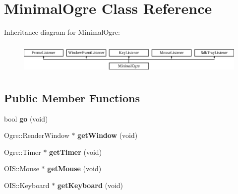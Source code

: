 \hypertarget{classMinimalOgre}{\section{Minimal\-Ogre Class Reference}
\label{classMinimalOgre}
}
Inheritance diagram for Minimal\-Ogre\-:\begin{figure}[H]
\begin{center}
\leavevmode
\includegraphics[height=1.588652cm]{classMinimalOgre}
\end{center}
\end{figure}
\subsection*{Public Member Functions}
\begin{DoxyCompactItemize}
\item 
\hypertarget{classMinimalOgre_a5b533da8a1744ab2ed1e58cb5c6f5d86}{bool {\bfseries go} (void)}\label{classMinimalOgre_a5b533da8a1744ab2ed1e58cb5c6f5d86}

\item 
\hypertarget{classMinimalOgre_aec9556ec93e5235a70c91f98023cb002}{Ogre\-::\-Render\-Window $\ast$ {\bfseries get\-Window} (void)}\label{classMinimalOgre_aec9556ec93e5235a70c91f98023cb002}

\item 
\hypertarget{classMinimalOgre_a8b6708bbf7c46caa6831b6f8da100baa}{Ogre\-::\-Timer $\ast$ {\bfseries get\-Timer} (void)}\label{classMinimalOgre_a8b6708bbf7c46caa6831b6f8da100baa}

\item 
\hypertarget{classMinimalOgre_a1efa7d60e19fb3a175f5180839cf9904}{O\-I\-S\-::\-Mouse $\ast$ {\bfseries get\-Mouse} (void)}\label{classMinimalOgre_a1efa7d60e19fb3a175f5180839cf9904}

\item 
\hypertarget{classMinimalOgre_aa680eefe324989faec4e8a511de631c6}{O\-I\-S\-::\-Keyboard $\ast$ {\bfseries get\-Keyboard} (void)}\label{classMinimalOgre_aa680eefe324989faec4e8a511de631c6}

\end{DoxyCompactItemize}
